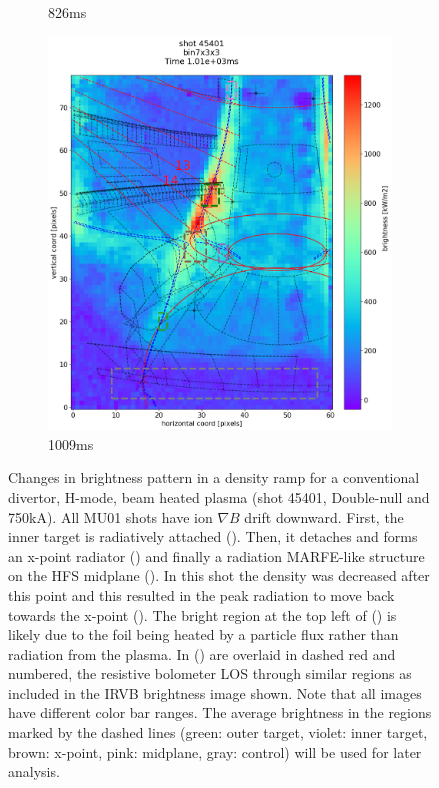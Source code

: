 \begin{figure}[!ht]
\begin{subfigure}{0.34\linewidth}
         \caption{826ms}
         \label{fig:45401_export_3}
     \end{subfigure}
     \begin{subfigure}{0.36\linewidth}
         \centering
         \includegraphics[trim={50 25 0 80},clip,width=\textwidth]{Chapters/chapter2/figs/IRVB-MASTU_shot-45401_export_66.png}
         \caption{1009ms}
         \label{fig:45401_export_4}
     \end{subfigure}
    \caption{Changes in brightness pattern in a density ramp for a conventional divertor, H-mode, beam heated plasma (shot 45401, Double-null and 750kA). All MU01 shots have ion $\nabla B$ drift downward. First, the inner target is radiatively attached (). Then, it detaches and forms an x-point radiator () and finally a radiation MARFE-like structure on the HFS midplane (). In this shot the density was decreased after this point and this resulted in the peak radiation to move back towards the x-point (). The bright region at the top left of () is likely due to the foil being heated by a particle flux rather than radiation from the plasma. In () are overlaid in dashed red and numbered, the resistive bolometer LOS through similar regions as included in the IRVB brightness image shown. Note that all images have different color bar ranges. The average brightness in the regions marked by the dashed lines (green: outer target, violet: inner target, brown: x-point, pink: midplane, gray: control) will be used for later analysis.}
    \label{fig:45401_export}
\end{figure}

